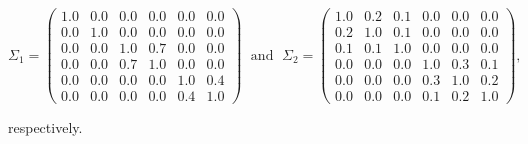 \documentclass[titlepage,11pt,twoside]{article}
\begin{document}
$$\Sigma_1 = \begin{pmatrix}
    1.0  &  0.0 & 0.0 & 0.0 & 0.0 & 0.0 \\
 0.0  &  1.0 & 0.0 & 0.0&  0.0 & 0.0 \\
 0.0   & 0.0 &  1.0 & 0.7 & 0.0 & 0.0 \\
 0.0 &  0.0 & 0.7 & 1.0 & 0.0 & 0.0 \\
0.0 &    0.0 &  0.0 & 0.0 & 1.0 & 0.4 \\
 0.0 & 0.0 &  0.0 & 0.0 & 0.4 & 1.0
\end{pmatrix}
\; \text{ and } \;
\Sigma_2 = \begin{pmatrix}
 1.0 & 0.2 & 0.1 & 0.0 & 0.0 & 0.0 \\
 0.2 & 1.0 & 0.1 & 0.0 & 0.0 & 0.0 \\
 0.1 & 0.1 & 1.0 & 0.0 & 0.0 & 0.0 \\
 0.0 & 0.0 & 0.0 & 1.0 & 0.3 & 0.1 \\
 0.0 & 0.0 & 0.0 & 0.3 & 1.0 & 0.2 \\
 0.0 & 0.0 & 0.0 & 0.1 & 0.2 & 1.0
\end{pmatrix},
$$

respectively.
\end{document}
